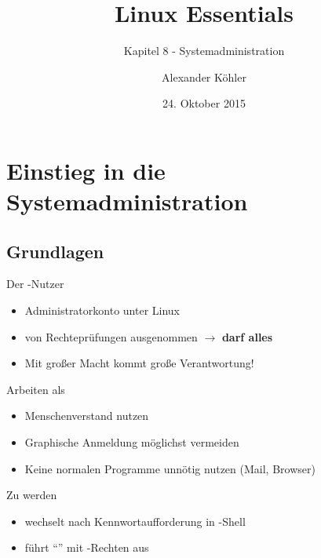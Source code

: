 \documentclass[aspectratio=43]{beamer}
\title[Linux Essentials  - Kapitel 8 - Systemadministration]{Linux Essentials}
\subtitle{Kapitel 8 - Systemadministration}
\author{Alexander Köhler}
\date{24. Oktober 2015}
\begin{document}
\logoframe

\frame{\titlepage}

\setcounter{tocdepth}{1}
\section[Gliederung]{}
\frame{\tableofcontents}


\section{Einstieg in die Systemadministration}
\subsection{Grundlagen}
\begin{frame}{}
  \begin{block}{Der -Nutzer}
    \begin{itemize}
      \item Administratorkonto unter Linux
      \item von Rechteprüfungen ausgenommen
      $\rightarrow$ \textbf{darf alles}
      \item Mit großer Macht kommt große Verantwortung!
    \end{itemize}
  \end{block}

  \begin{block}{Arbeiten als }
    \begin{itemize}
      \item Menschenverstand nutzen
      \item Graphische Anmeldung möglichst vermeiden
      \item Keine normalen Programme unnötig nutzen (Mail, Browser)
    \end{itemize}
  \end{block}
    \begin{alertblock}{Zu  werden}
    \begin{itemize}
      \item {} wechselt nach Kennwortaufforderung in  -Shell
      \item {} führt ``'' mit -Rechten aus
    \end{itemize}
  \end{alertblock}
\end{frame}
\end{document}

